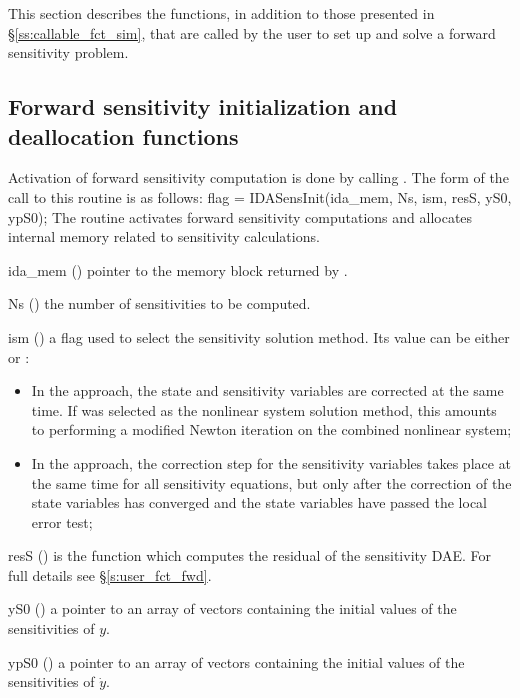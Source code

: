 This section describes the {\idas} functions, in addition to those presented
in \S\ref{ss:callable_fct_sim}, that are called by the user to set up and solve
a forward sensitivity problem.

\subsection{Forward sensitivity initialization and deallocation functions}
\label{ss:sensi_init}
Activation of forward sensitivity computation is done by calling
.
The form of the call to this routine is as follows:
{
  flag = IDASensInit(ida\_mem, Ns, ism, resS, yS0, ypS0);
}
{
  The routine  activates forward sensitivity computations and
  allocates internal memory related to sensitivity calculations.
}
{
  \begin{args}

  \item[ida\_mem] ()
    pointer to the {\idas} memory block returned by .
  \item[Ns] () 
    the number of sensitivities to be computed.
  \item[ism] ()
    a flag used to select the sensitivity solution method.  Its value can 
    be either  or :
    \begin{itemize}
    \item In the  approach, the state and sensitivity variables are
      corrected at the same time. If  was selected as the nonlinear system 
      solution method, this amounts to performing a modified Newton iteration on the
      combined nonlinear system;
    \item In the  approach, the correction step for the sensitivity
      variables takes place at the same time for all sensitivity equations, but only after 
      the correction of the state variables has converged and the state variables 
      have passed the local error test; 
    \end{itemize}
  \item[resS] ()
    is the {\CC} function which computes the residual of the sensitivity DAE. 
    For full details see \S\ref{s:user_fct_fwd}.
  \item[yS0] () 
    a pointer to an array of  vectors containing the initial 
    values of the sensitivities of $y$.
  \item[ypS0] () 
    a pointer to an array of  vectors containing the initial 
    values of the sensitivities of $\dot{y}$.
  \end{args}
}
